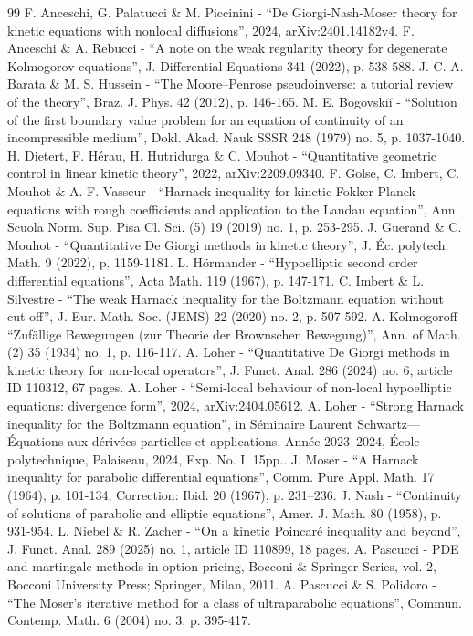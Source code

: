 \begin{thebibliography}{99}
 F. Anceschi, G. Palatucci \& M. Piccinini - “De Giorgi-Nash-Moser theory for kinetic equations with nonlocal diffusions”, 2024, arXiv:2401.14182v4.
 F. Anceschi \& A. Rebucci - “A note on the weak regularity theory for degenerate Kolmogorov equations”, J. Differential Equations 341 (2022), p. 538-588.
 J. C. A. Barata \& M. S. Hussein - “The Moore–Penrose pseudoinverse: a tutorial review of the theory”, Braz. J. Phys. 42 (2012), p. 146-165.
 M. E. Bogovskiĭ - “Solution of the first boundary value problem for an equation of continuity of an incompressible medium”, Dokl. Akad. Nauk SSSR 248 (1979) no. 5, p. 1037-1040.
 H. Dietert, F. Hérau, H. Hutridurga \& C. Mouhot - “Quantitative geometric control in linear kinetic theory”, 2022, arXiv:2209.09340.
 F. Golse, C. Imbert, C. Mouhot \& A. F. Vasseur - “Harnack inequality for kinetic Fokker-Planck equations with rough coefficients and application to the Landau equation”, Ann. Scuola Norm. Sup. Pisa Cl. Sci. (5) 19 (2019) no. 1, p. 253-295.
 J. Guerand \& C. Mouhot - “Quantitative De Giorgi methods in kinetic theory”, J. Éc. polytech. Math. 9 (2022), p. 1159-1181.
 L. Hörmander - “Hypoelliptic second order differential equations”, Acta Math. 119 (1967), p. 147-171.
 C. Imbert \& L. Silvestre - “The weak Harnack inequality for the Boltzmann equation without cut-off”, J. Eur. Math. Soc. (JEMS) 22 (2020) no. 2, p. 507-592.
 A. Kolmogoroff - “Zufällige Bewegungen (zur Theorie der Brownschen Bewegung)”, Ann. of Math. (2) 35 (1934) no. 1, p. 116-117.
 A. Loher - “Quantitative De Giorgi methods in kinetic theory for non-local operators”, J. Funct. Anal. 286 (2024) no. 6, article ID 110312, 67 pages.
 A. Loher - “Semi-local behaviour of non-local hypoelliptic equations: divergence form”, 2024, arXiv:2404.05612.
 A. Loher - “Strong Harnack inequality for the Boltzmann equation”, in Séminaire Laurent Schwartz—Équations aux dérivées partielles et applications. Année 2023–2024, École polytechnique, Palaiseau, 2024, Exp. No. I, 15pp..
 J. Moser - “A Harnack inequality for parabolic differential equations”, Comm. Pure Appl. Math. 17 (1964), p. 101-134, Correction: Ibid. 20 (1967), p. 231–236.
 J. Nash - “Continuity of solutions of parabolic and elliptic equations”, Amer. J. Math. 80 (1958), p. 931-954.
 L. Niebel \& R. Zacher - “On a kinetic Poincaré inequality and beyond”, J. Funct. Anal. 289 (2025) no. 1, article ID 110899, 18 pages.
 A. Pascucci - PDE and martingale methods in option pricing, Bocconi \& Springer Series, vol. 2, Bocconi University Press; Springer, Milan, 2011.
 A. Pascucci \& S. Polidoro - “The Moser’s iterative method for a class of ultraparabolic equations”, Commun. Contemp. Math. 6 (2004) no. 3, p. 395-417.
\end{thebibliography}
